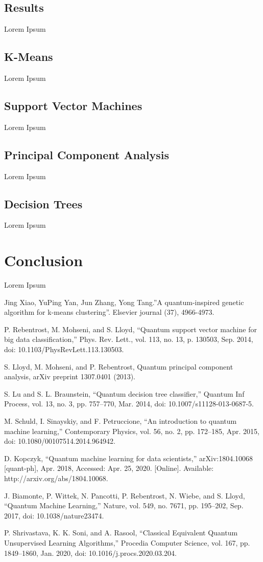 \documentclass[conference]{IEEEtran}
\begin{document}
\subsection{Results}
Lorem Ipsum
\subsection{K-Means}
Lorem Ipsum
\subsection{Support Vector Machines}
Lorem Ipsum
\subsection{Principal Component Analysis}
Lorem Ipsum
\subsection{Decision Trees}
Lorem Ipsum

\section{Conclusion}
Lorem Ipsum


\begin{thebibliography}{00}

Jing Xiao, YuPing Yan, Jun Zhang, Yong Tang.”A quantum-inspired genetic algorithm for k-means clustering”. Elsevier
journal (37), 4966-4973. 

P. Rebentrost, M. Mohseni, and S. Lloyd, “Quantum support vector machine for big data classification,” Phys. Rev. Lett., vol. 113, no. 13, p. 130503, Sep. 2014, doi: 10.1103/PhysRevLett.113.130503.

 S. Lloyd, M. Mohseni, and P. Rebentrost, Quantum principal component analysis, arXiv preprint 1307.0401 (2013).

S. Lu and S. L. Braunstein, “Quantum decision tree classifier,” Quantum Inf Process, vol. 13, no. 3, pp. 757–770, Mar. 2014, doi: 10.1007/s11128-013-0687-5.

M. Schuld, I. Sinayskiy, and F. Petruccione, “An introduction to quantum machine learning,” Contemporary Physics, vol. 56, no. 2, pp. 172–185, Apr. 2015, doi: 10.1080/00107514.2014.964942.

D. Kopczyk, “Quantum machine learning for data scientists,” arXiv:1804.10068 [quant-ph], Apr. 2018, Accessed: Apr. 25, 2020. [Online]. Available: http://arxiv.org/abs/1804.10068.

J. Biamonte, P. Wittek, N. Pancotti, P. Rebentrost, N. Wiebe, and S. Lloyd, “Quantum Machine Learning,” Nature, vol. 549, no. 7671, pp. 195–202, Sep. 2017, doi: 10.1038/nature23474.

P. Shrivastava, K. K. Soni, and A. Rasool, “Classical Equivalent Quantum Unsupervised Learning Algorithms,” Procedia Computer Science, vol. 167, pp. 1849–1860, Jan. 2020, doi: 10.1016/j.procs.2020.03.204.

\end{thebibliography}
\end{document}
